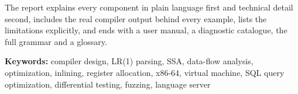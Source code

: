 The report explains every component in plain language first and technical detail second, includes the real compiler output behind every example, lists the limitations explicitly, and ends with a user manual, a diagnostic catalogue, the full grammar and a glossary.

\vspace{1em}
\begin{center}\sffamily\small\color{grey}
\textbf{Keywords:} compiler design, LR(1) parsing, SSA, data-flow analysis, optimization, inlining, register allocation, x86-64, virtual machine, SQL query optimization, differential testing, fuzzing, language server
\end{center}
